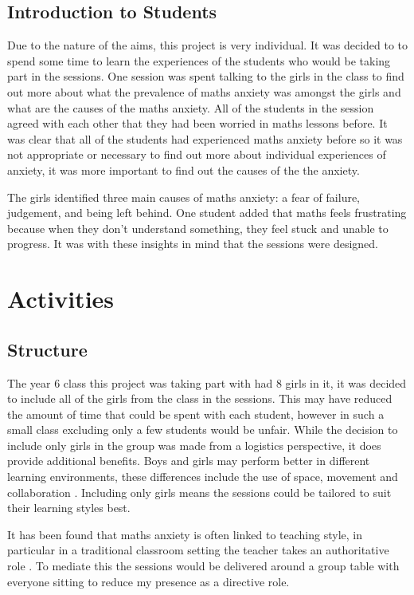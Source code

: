 \documentclass[11pt, a4paper, notitlepage]{article}
\begin{document}
\subsection{Introduction to Students}
Due to the nature of the aims, this project is very individual. It was decided to to spend some time to learn the experiences of the students who would be taking part in the sessions. One session was spent talking to the girls in the class to find out more about what the prevalence of maths anxiety was amongst the girls and what are the causes of the maths anxiety. All of the students in the session agreed with each other that they had been worried in maths lessons before. It was clear that all of the students had experienced maths anxiety before so it was not appropriate or necessary to find out more about individual experiences of anxiety, it was more important to find out the causes of the the anxiety.
\par
The girls identified three main causes of maths anxiety: a fear of failure, judgement, and being left behind. One student added that maths feels frustrating because when they don't understand something, they feel stuck and unable to progress. It was with these insights in mind that the sessions were designed.

\section{Activities}
\subsection{Structure}
The year 6 class this project was taking part with had 8 girls in it, it was decided to include all of the girls from the class in the sessions. This may have reduced the amount of time that could be spent with each student, however in such a small class excluding only a few students would be unfair. While the decision to include only girls in the group was made from a logistics perspective, it does provide additional benefits. Boys and girls may perform better in different learning environments, these differences include the use of space, movement and collaboration \cite{Hughes:2006}. Including only girls means the sessions could be tailored to suit their learning styles best.

\par It has been found that maths anxiety is often linked to teaching style, in particular in a traditional classroom setting the teacher takes an authoritative role \cite{Finlayson:2014}. To mediate this the sessions would be delivered around a group table with everyone sitting to reduce my presence as a directive role. 
\end{document}
